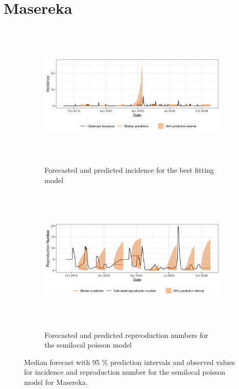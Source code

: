  \section{ Masereka }\begin{figure}[H]\begin{subfigure}{\textwidth}  \centering  \includegraphics[width=0.9\linewidth, height=7cm]{../output/Masereka_predictions.png}  \caption{Forecasted and predicted incidence for the best fitting model}\end{subfigure}

\begin{subfigure}{\textwidth}  \centering  \includegraphics[width=0.9\linewidth, height=7cm]{../output/Masereka_Rs.png}  \caption{Forecasted and predicted repreoduction numbers for the semilocal poisson model}\end{subfigure}  \caption{Median forecast with 95 \% prediction intervals and observed values for incidence and reproduction number for the semilocal poisson model for Masereka.}\end{figure}


